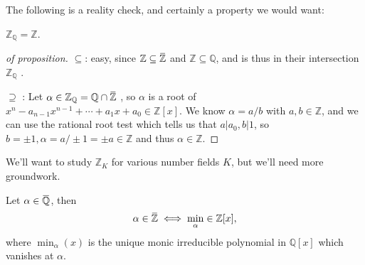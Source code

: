 The following is a reality check, and certainly a property we would
want:

\begin{proposition}

\({\mathbb{Z}}_{\mathbb{Q}}= {\mathbb{Z}}\).

\end{proposition}

\begin{proof}[of proposition]

\(\subseteq\): easy, since
\({\mathbb{Z}}\subseteq \mkern 1.5mu\overline{\mkern-1.5mu{\mathbb{Z}}\mkern-1.5mu}\mkern 1.5mu\)
and \({\mathbb{Z}}\subseteq {\mathbb{Q}}\), and is thus in their
intersection \({\mathbb{Z}}_{\mathbb{Q}}\) .

\(\supseteq\) : Let
\(\alpha\in {\mathbb{Z}}_{\mathbb{Q}}= {\mathbb{Q}}\cap\mkern 1.5mu\overline{\mkern-1.5mu{\mathbb{Z}}\mkern-1.5mu}\mkern 1.5mu\)
, so \(\alpha\) is a root of
\(x^n - a_{n-1}x^{n-1} + \cdots + a_1x + a_0 \in {\mathbb{Z}}[x]\). We
know \(\alpha= a/b\) with \(a,b \in {\mathbb{Z}}\), and we can use the
rational root test which tells us that
\(a\mathrel{\Big|}a_0, b\mathrel{\Big|}1\), so
\(b = \pm 1, \alpha = a/\pm 1 = \pm a \in {\mathbb{Z}}\) and thus
\(\alpha \in {\mathbb{Z}}\).

\end{proof}

We'll want to study \({\mathbb{Z}}_K\) for various number fields \(K\),
but we'll need more groundwork.

\begin{proposition}

Let
\(\alpha \in \mkern 1.5mu\overline{\mkern-1.5mu{\mathbb{Q}}\mkern-1.5mu}\mkern 1.5mu\),
then
\begin{align*} \alpha\in \mkern 1.5mu\overline{\mkern-1.5mu{\mathbb{Z}}\mkern-1.5mu}\mkern 1.5mu\iff \min_ \alpha \in {\mathbb{Z}}[x], \end{align*}
where \(\min_ \alpha(x)\) is the unique monic irreducible polynomial in
\({\mathbb{Q}}[x]\) which vanishes at \(\alpha\).

\end{proposition}

